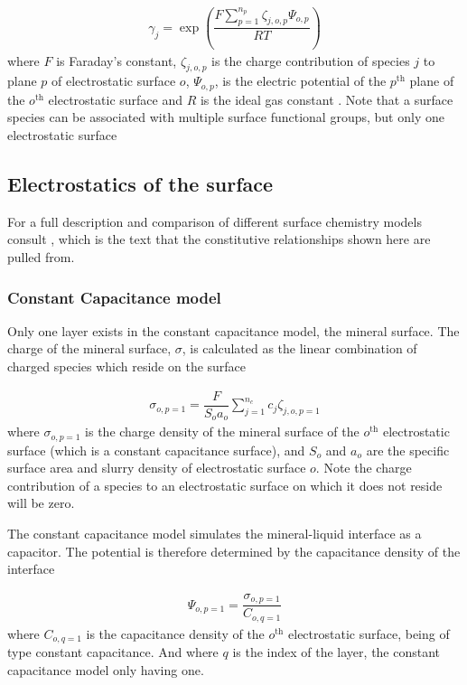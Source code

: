 \documentclass{article}
\begin{document}
\begin{align}
    \gamma_j = \exp\left(\dfrac{F\sum_{p=1}^{n_p}\zeta_{j,o,p}\Psi_{o,p}}{RT}\right)\label{eq:surfAct}
\end{align}
where $F$ is Faraday's constant, $\zeta_{j,o,p}$ is the charge contribution of species $j$ to plane $p$ of electrostatic surface $o$, $\Psi_{o,p}$, is the electric potential of the $p^\text{th}$ plane of the $o^\text{th}$ electrostatic surface and $R$ is the ideal gas constant \cite{Hiemstra1989a}{}. Note that a surface species can be associated with multiple surface functional groups, but only one electrostatic surface

\subsection{Electrostatics of the surface}

For a full description and comparison of different surface chemistry models consult \citet{westall1980}{}, which is the text that the constitutive relationships shown here are pulled from. 

\subsubsection{Constant Capacitance model}
Only one layer exists in the constant capacitance model, the mineral surface. The charge of the mineral surface, $\sigma$, is calculated as the linear combination of charged species which reside on the surface

\begin{align}
    \sigma_{o,p=1} = \dfrac{F}{S_o a_o}\sum_{j=1}^{n_c}c_j\zeta_{j,o,p=1}
\end{align}
where $\sigma_{o,p=1}$ is the charge density of the mineral surface of the $o^\text{th}$ electrostatic surface (which is a constant capacitance surface), and $S_o$ and $a_o$ are the specific surface area and slurry density of electrostatic surface $o$. Note the charge contribution of a species to an electrostatic surface on which it does not reside will be zero.

The constant capacitance model simulates the mineral-liquid interface as a capacitor. The potential is therefore determined by the capacitance density of the interface

\begin{align}
    \Psi_{o,p=1} = \dfrac{\sigma_{o,p=1}}{C_{o,q=1}}
\end{align}
where $C_{o,q=1}$ is the capacitance density of the $o^\text{th}$ electrostatic surface, being of type constant capacitance. And where $q$ is the index of the layer, the constant capacitance model only having one.  
\end{document}
